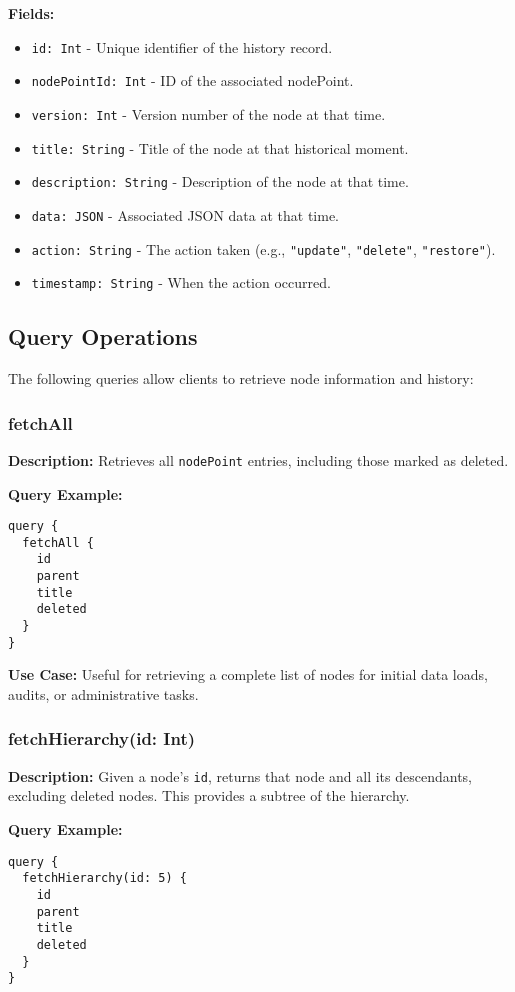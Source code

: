 \documentclass[12pt,a4paper]{article}
\begin{document}
\noindent \textbf{Fields:}
\begin{itemize}
    \item \texttt{id: Int} - Unique identifier of the history record.
    \item \texttt{nodePointId: Int} - ID of the associated nodePoint.
    \item \texttt{version: Int} - Version number of the node at that time.
    \item \texttt{title: String} - Title of the node at that historical moment.
    \item \texttt{description: String} - Description of the node at that time.
    \item \texttt{data: JSON} - Associated JSON data at that time.
    \item \texttt{action: String} - The action taken (e.g., \texttt{"update"}, \texttt{"delete"}, \texttt{"restore"}).
    \item \texttt{timestamp: String} - When the action occurred.
\end{itemize}

\subsection{Query Operations}
The following queries allow clients to retrieve node information and history:

\subsubsection{fetchAll}
\textbf{Description:}
Retrieves all \texttt{nodePoint} entries, including those marked as deleted.

\noindent \textbf{Query Example:}
\begin{verbatim}
query {
  fetchAll {
    id
    parent
    title
    deleted
  }
}
\end{verbatim}

\noindent \textbf{Use Case:}
Useful for retrieving a complete list of nodes for initial data loads, audits, or administrative tasks.

\subsubsection{fetchHierarchy(id: Int)}
\textbf{Description:}
Given a node’s \texttt{id}, returns that node and all its descendants, excluding deleted nodes. This provides a subtree of the hierarchy.

\noindent \textbf{Query Example:}
\begin{verbatim}
query {
  fetchHierarchy(id: 5) {
    id
    parent
    title
    deleted
  }
}
\end{verbatim}
\end{document}
